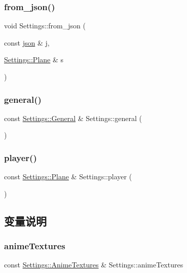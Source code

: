 \subsubsection{\texorpdfstring{from\+\_\+json()}{from\_json()}\hspace{0.1cm}{\footnotesize\ttfamily [2/2]}}
{\footnotesize\ttfamily void Settings\+::from\+\_\+json (\begin{DoxyParamCaption}\item[{const \hyperlink{_resources_loader_8cpp_ab701e3ac61a85b337ec5c1abaad6742d}{json} \&}]{j,  }\item[{\hyperlink{struct_settings_1_1_plane}{Settings\+::\+Plane} \&}]{s }\end{DoxyParamCaption})}

\mbox{\label{namespace_settings_a8d5eb32bea233e3b9ae9ce6e29b8d8bb}} 
\subsubsection{\texorpdfstring{general()}{general()}}
{\footnotesize\ttfamily const \hyperlink{struct_settings_1_1_general}{Settings\+::\+General} \& Settings\+::general (\begin{DoxyParamCaption}{ }\end{DoxyParamCaption})}

\mbox{\label{namespace_settings_ab78c6dca0d1b2fc76eae348e81a3eed7}} 
\subsubsection{\texorpdfstring{player()}{player()}}
{\footnotesize\ttfamily const \hyperlink{struct_settings_1_1_plane}{Settings\+::\+Plane} \& Settings\+::player (\begin{DoxyParamCaption}{ }\end{DoxyParamCaption})}



\subsection{变量说明}
\mbox{\label{namespace_settings_a60c5dfdfb55f1abb671e786f06fc24dd}} 
\subsubsection{\texorpdfstring{anime\+Textures}{animeTextures}}
{\footnotesize\ttfamily const \hyperlink{struct_settings_1_1_anime_textures}{Settings\+::\+Anime\+Textures} \& Settings\+::anime\+Textures}

